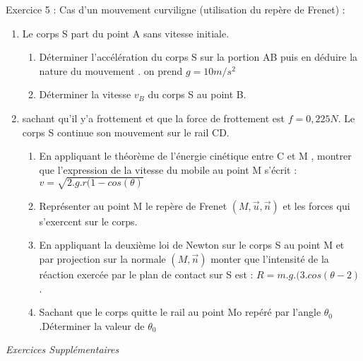 \documentclass[12pt, french]{article}
\begin{document}
\begin{Box2}{Exercice 5 : Cas d'un mouvement curviligne (utilisation du repère de Frenet) : }
\begin{enumerate}
	\item Le corps S part du point A sans vitesse initiale.
		\begin{enumerate}
			\item Déterminer l'accélération du corps S sur la portion AB puis en déduire la nature du mouvement . on prend $g=10m/s^2$
			\item Déterminer la vitesse $v_B$ du corps S au point B.
		\end{enumerate}
	\item   sachant qu'il y'a frottement et que la force de frottement est $f=0,225N$. Le corps S continue son mouvement sur le rail CD.
		\begin{enumerate}
			\item  En appliquant le théorème de l'énergie cinétique entre C et M , montrer que l'expression de la vitesse du mobile au point M s'écrit : $v=\sqrt{2.g.r(1-cos(\theta)}$
			\item Représenter au point M le repère de Frenet $(M,\vec{u},\vec{n})$
et les forces qui s'exercent sur le corps.
\item En appliquant la deuxième loi de Newton sur le corps S au point M et par projection sur la normale $(M,\vec{n})$ monter que l’intensité de la réaction exercée par le plan de contact sur S est : $R=m.g.(3.cos(\theta -2)$.
\item Sachant que le corps quitte le rail au point Mo repéré par l'angle $\theta_0$
.Déterminer la valeur de $\theta_0$
\end{enumerate}
\end{enumerate}



\end{Box2}


\begin{center}
   \Large{ \em{Exercices Supplémentaires}}
\end{center}

\end{document}
